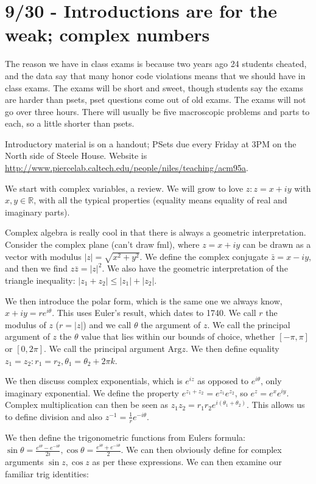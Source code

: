 \documentclass[10pt]{report}
\newcommand{\abs}[1]{\left|#1\right|}
\newcommand{\Arg}[0]{\mathrm{Arg} }
\begin{document}
\chapter{9/30 - Introductions are for the weak; complex numbers}

The reason we have in class exams is because two years ago 24 students cheated, and the data say that many honor code violations means that we should have in class exams. The exams will be short and sweet, though students say the exams are harder than psets, pset questions come out of old exams. The exams will not go over three hours. There will usually be five macroscopic problems and parts to each, so a little shorter than psets.

Introductory material is on a handout; PSets due every Friday at 3PM on the North side of Steele House. Website is \url{http://www.piercelab.caltech.edu/people/niles/teaching/acm95a}.

We start with complex variables, a review. We will grow to love $z:z=x+iy$ with $x,y\in\mathbb{R}$, with all the typical properties (equality means equality of real and imaginary parts).

Complex algebra is really cool in that there is always a geometric interpretation. Consider the complex plane (can't draw fml), where $z=x+iy$ can be drawn as a vector with modulus $|z|=\sqrt{x^2+y^2}$. We define the complex conjugate $\bar{z}=x-iy$, and then we find $z\bar{z}=\abs{z}^2$. We also have the geometric interpretation of the triangle inequality: $\abs{z_1+z_2}\leq \abs{z_1}+\abs{z_2}$.

We then introduce the polar form, which is the same one we always know, $x+iy=re^{i\theta}$. This uses Euler's result, which dates to 1740. We call $r$ the modulus of $z$ ($r=\abs{z}$) and we call $\theta$ the argument of $z$. We call the principal argument of $z$ the $\theta$ value that lies within our bounds of choice, whether $[-\pi,\pi]$ or $[0,2\pi]$. We call the principal argument $\Arg{z}$. We then define equality $z_1=z_2: r_1=r_2, \theta_1=\theta_2+2\pi k$. 

We then discuss complex exponentials, which is $e^{iz}$ as opposed to $e^{i\theta}$, only imaginary exponential. We define the property $e^{z_1 + z_2}=e^{z_1}e^{z_2}$, so $e^{z}=e^xe^{iy}$. Complex multiplication can then be seen as $z_1z_2=r_1r_2e^{i(\theta_1+\theta_2)}$. This allows us to define division and also $z^{-1} = \frac{1}{r}e^{-i\theta}$.

We then define the trigonometric functions from Eulers formula: $\sin\theta=\frac{e^{i\theta} - e^{-i\theta}}{2i}, \cos\theta=\frac{e^{i\theta}+e^{-i\theta}}{2}$. We can then obviously define for complex arguments $\sin z, \cos z$ as per these expressions. We can then examine our familiar trig identities:
\end{document}
